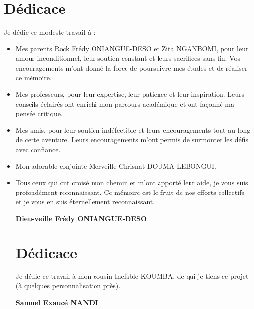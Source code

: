 \chapter*{Dédicace}
Je dédie ce modeste travail à :

\begin{itemize}
  \item {
      Mes parents Rock Frédy ONIANGUE-DESO et Zita NGANBOMI, pour leur amour
      inconditionnel, leur soutien constant et leurs sacrifices sans fin. Vos
      encouragements m’ont donné la force de poursuivre mes études et de réaliser ce mémoire.
    }
  \item {
      Mes professeurs, pour leur expertise, leur patience et leur inspiration.
      Leurs conseils éclairés ont enrichi mon parcours académique et ont façonné ma pensée critique.

    }
  \item {
      Mes amis, pour leur soutien indéfectible et leurs encouragements tout au
      long de cette aventure. Leurs encouragements m’ont permis de surmonter les défis avec confiance.

    }

  \item {
      Mon adorable conjointe Merveille Chrisnat DOUMA LEBONGUI.

    }

  \item {
      Tous ceux qui ont croisé mon chemin et m’ont apporté leur aide,
      je vous suis profondément reconnaissant. Ce mémoire est le fruit de nos
      efforts collectifs et je vous en suis éternellement reconnaissant.
    }

    \vspace{0.2cm}
    \begin{flushright}
      \large {
        \textbf {
          Dieu-veille Frédy ONIANGUE-DESO
        }
      }
    \end{flushright}


    \newpage
\chapter*{Dédicace}

    \vspace{2cm}
    Je dédie ce travail à mon cousin  Inefable KOUMBA, de qui je tiens ce projet (à quelques personnalisation près).
    \vspace{0.2cm}
    \begin{flushright}
      \large {
        \textbf {
          Samuel Exaucé NANDI
        }
      }
    \end{flushright}

\end{itemize}
